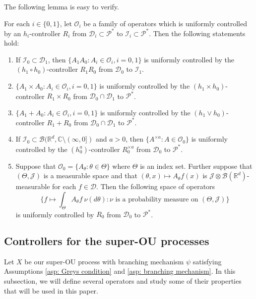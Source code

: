 \documentclass[EJP]{ejpecp} %
\begin{document}
	The following lemma is easy to verify.
\begin{lemma}
\label{lem: property of controllable operators}
	For each $i \in \{0,1\}$, let $\mathscr O_i$ be a family of operators which is  uniformly controlled by an $h_i$-controller $R_i$ from $\mathcal D_i \subset \mathcal P^*$ to $ \mathcal I_i \subset \mathcal P^*$.
	Then the following statements hold:
\begin{enumerate}
\item
	If $\mathcal I_0 \subset \mathcal D_1$, then $\{A_1A_0: A_i \in \mathscr O_i, i = 0,1\}$ is uniformly controlled by the $(h_1 \circ h_0)$-controller $R_1R_0$ from $\mathcal D_0$ to $\mathcal I_1$.
\item
    $\{ A_1 \times A_0: A_i \in \mathscr O_i, i = 0,1\}$ is uniformly controlled by the $(h_1\times h_0)$-controller $R_1 \times R_0$ from $\mathcal D_0 \cap \mathcal D_1$ to $\mathcal P^*$.
\item
    $\{ A_1 + A_0: A_i \in \mathscr O_i, i = 0,1\}$ is uniformly controlled by the $(h_1 \vee h_0)$-controller $R_1 + R_0$ from $\mathcal D_0 \cap \mathcal D_1$ to $\mathcal P^*$.
\item
    If $\mathcal I_0 \subset \mathcal B(\mathbb R^d, \mathbb C \setminus (\infty, 0])$ and $a>0$, then $\{A^{\times a} : A \in \mathscr O_0\}$ is uniformly controlled by the $(h_0^a)$-controller $R_0^{\times a}$ from $\mathcal D_0$ to $\mathcal P^*$.
\item
    Suppose that $\mathscr O_0 = \{A_\theta: \theta \in \Theta \}$ where $\Theta$ is an index set.
    Further suppose that $(\Theta, \mathcal J )$ is a measurable space and that $(\theta,x) \mapsto A_\theta f(x)$ is $\mathcal J \otimes \mathcal B(\mathbb R^d)$-measurable for each $f\in \mathcal D$.
    Then the following space of operators
\[
   	\Big\{ f \mapsto \int_{\Theta} A_\theta f~\nu(d\theta) : \nu \text{ is a probability measure on } (\Theta, \mathcal J) \Big\}
\]
    is uniformly controlled by $R_0$ from $\mathcal D_0$ to $\mathcal P^*$.
\end{enumerate}
\end{lemma}

\subsection{Controllers for the super-OU processes}
\label{sec: h-controller}
	Let $X$ be our super-OU process with branching mechanism $\psi$ satisfying
	Assumptions \ref{asp: Greys condition} and \ref{asp: branching mechanism}.
	In this subsection, we will define several operators and study some of their properties that will be used in this paper.
\end{document}
